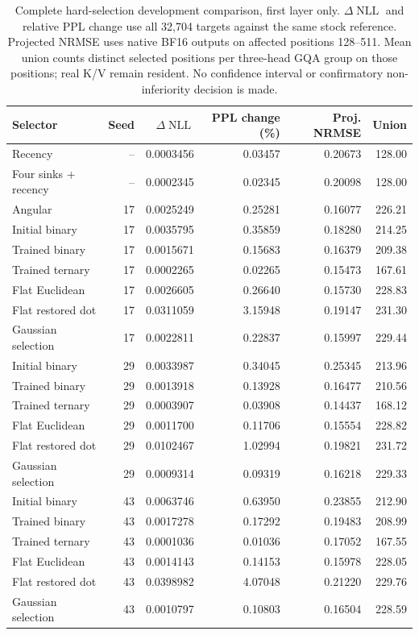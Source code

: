 \documentclass[11pt]{article}
\newcommand{\NLL}{\operatorname{NLL}}
\begin{document}
\begin{table}[htbp]
\centering\small
\caption{Complete hard-selection development comparison, first layer only.
\(\Delta\NLL\) and relative PPL change use all 32,704 targets against the
same stock reference. Projected NRMSE uses native BF16 outputs on affected
positions 128--511. Mean union counts distinct selected positions per
three-head GQA group on those positions; real K/V remain resident.
No confidence interval or confirmatory non-inferiority decision is made.}
\begin{tabular}{lrrrrr}
\toprule
Selector & Seed & \(\Delta\NLL\) & PPL change (\%) & Proj. NRMSE & Union\\
\midrule
Recency & -- & 0.0003456 & 0.03457 & 0.20673 & 128.00\\
Four sinks + recency & -- & 0.0002345 & 0.02345 & 0.20098 & 128.00\\
Angular & 17 & 0.0025249 & 0.25281 & 0.16077 & 226.21\\
\midrule
Initial binary & 17 & 0.0035795 & 0.35859 & 0.18280 & 214.25\\
Trained binary & 17 & 0.0015671 & 0.15683 & 0.16379 & 209.38\\
Trained ternary & 17 & 0.0002265 & 0.02265 & 0.15473 & 167.61\\
Flat Euclidean & 17 & 0.0026605 & 0.26640 & 0.15730 & 228.83\\
Flat restored dot & 17 & 0.0311059 & 3.15948 & 0.19147 & 231.30\\
Gaussian selection & 17 & 0.0022811 & 0.22837 & 0.15997 & 229.44\\
\midrule
Initial binary & 29 & 0.0033987 & 0.34045 & 0.25345 & 213.96\\
Trained binary & 29 & 0.0013918 & 0.13928 & 0.16477 & 210.56\\
Trained ternary & 29 & 0.0003907 & 0.03908 & 0.14437 & 168.12\\
Flat Euclidean & 29 & 0.0011700 & 0.11706 & 0.15554 & 228.82\\
Flat restored dot & 29 & 0.0102467 & 1.02994 & 0.19821 & 231.72\\
Gaussian selection & 29 & 0.0009314 & 0.09319 & 0.16218 & 229.33\\
\midrule
Initial binary & 43 & 0.0063746 & 0.63950 & 0.23855 & 212.90\\
Trained binary & 43 & 0.0017278 & 0.17292 & 0.19483 & 208.99\\
Trained ternary & 43 & 0.0001036 & 0.01036 & 0.17052 & 167.55\\
Flat Euclidean & 43 & 0.0014143 & 0.14153 & 0.15978 & 228.05\\
Flat restored dot & 43 & 0.0398982 & 4.07048 & 0.21220 & 229.76\\
Gaussian selection & 43 & 0.0010797 & 0.10803 & 0.16504 & 228.59\\
\bottomrule
\end{tabular}
\label{tab:learned-development}
\end{table}
\end{document}
